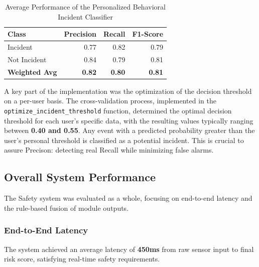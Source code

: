 \documentclass[12pt,a4paper,oneside,english]{book}
\begin{document}
\begin{table}[h!]
    \centering
    \caption{Average Performance of the Personalized Behavioral Incident Classifier}
    \label{tab:behavioral_results}
    \begin{tabular}{lrrr}
        \hline
        \textbf{Class} & \textbf{Precision} & \textbf{Recall} & \textbf{F1-Score} \\ \hline
        Incident       & 0.77               & 0.82            & 0.79              \\
        Not Incident   & 0.84               & 0.79            & 0.81              \\ \hline
        \textbf{Weighted Avg} & \textbf{0.82} & \textbf{0.80} & \textbf{0.81} \\ \hline
    \end{tabular}
\end{table}

A key part of the implementation was the optimization of the decision threshold on a per-user basis. The cross-validation process, 
implemented in the \texttt{optimize\_incident\_threshold} function, determined the optimal decision threshold for each user's specific data, 
with the resulting values typically ranging between \textbf{0.40 and 0.55}. Any event with a predicted probability greater than the user's 
personal threshold is classified as a potential incident. This is crucial to assure Precison: detecting real Recall while minimizing false alarms.


    \subsection{Overall System Performance}
\label{subsec:overall_results}

The Safety system was evaluated as a whole, focusing on end-to-end latency and the rule-based fusion of module outputs.

\subsubsection{End-to-End Latency}
The system achieved an average latency of \textbf{450ms} from raw sensor input to final risk score, satisfying real-time safety requirements.
\end{document}
